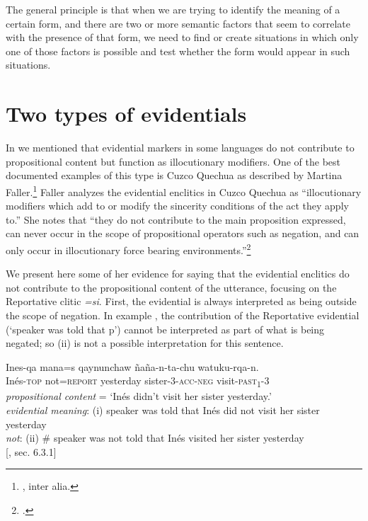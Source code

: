 The general principle is that when we are trying to identify the meaning of a certain form, and there are two or more semantic factors that seem to correlate with the presence of that form, we need to find or create situations in which only one of those factors is possible and test whether the form would appear in such situations.


\section{Two types of evidentials}\label{sec:17.5}

In  we mentioned that evidential markers in some languages do not contribute to propositional content but function as illocutionary modifiers. One of the best documented examples of this type is Cuzco Quechua as described by Martina Faller.\footnote{\citet{Faller2002,Faller2003,Faller2006}, inter alia.} Faller analyzes the evidential enclitics in Cuzco Quechua as “illocutionary modifiers which add to or modify the sincerity conditions of the act they apply to.” She notes that “they do not contribute to the main proposition expressed, can never occur in the scope of propositional operators such as negation, and can only occur in illocutionary force bearing environments.”\footnote{\citet[v]{Faller2002}.}



We present here some of her evidence for saying that the evidential enclitics do not contribute to the propositional content of the utterance, focusing on the Reportative clitic \textit{=si}. First, the evidential is always interpreted as being outside the scope of negation. In example , the contribution of the Reportative evidential (‘speaker was told that p’) cannot be interpreted as part of what is being negated; so (ii) is not a possible interpretation for this sentence.


\ea \label{ex:17.6}
\gll Ines-qa  mana=s  qaynunchaw  ñaña-n-ta-chu  watuku-rqa-n.\\
Inés-\textsc{top}  not=\textsc{report}  yesterday  sister-3-\textsc{acc-neg}  visit\textsc{-past}\textsc{\textsubscript{1}}-3\\
\glt \textit{propositional content} = ‘Inés didn’t visit her sister yesterday.’\\
\textit{evidential meaning}: (i) speaker was told that Inés did not visit her sister yesterday\\
  \textit{not}:  (ii) \# speaker was not told that Inés visited her sister yesterday\\
{}[\citealt{Faller2002}, sec. 6.3.1]
\z


